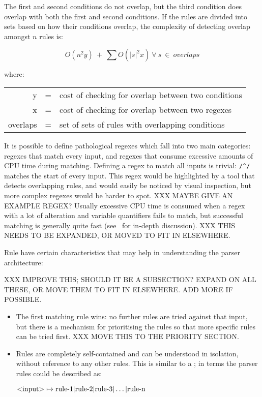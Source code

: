 \noindent{}The first and second conditions do not overlap, but the third
condition does overlap with both the first and second conditions.  If the
rules are divided into sets based on how their conditions overlap, the
complexity of detecting overlap amongst $n$ rules is:

$$O(n^{2}y)~+~\sum{O(|s|^{2}x)~\forall{}~s~\in{}~overlaps}$$

where:

\begin{tabular}[]{rcl}

            y & = & cost of checking for overlap between two conditions \\
            x & = & cost of checking for overlap between two regexes    \\
     overlaps & = & set of sets of rules with overlapping conditions    \\

\end{tabular}

It is possible to define pathological regexes which fall into two main
categories: regexes that match every input, and regexes that consume
excessive amounts of CPU time during matching.  Defining a regex to match
all inputs is trivial: \verb!/^/! matches the start of every input.  This
regex would be highlighted by a tool that detects overlapping rules, and
would easily be noticed by visual inspection, but more complex regexes
would be harder to spot.  XXX MAYBE GIVE AN EXAMPLE REGEX\@?  Usually
excessive CPU time is consumed when a regex with a lot of alteration and
variable quantifiers fails to match, but successful matching is generally
quite fast (see~\cite{mastering-regular-expressions} for in-depth
discussion).  XXX THIS NEEDS TO BE EXPANDED, OR MOVED TO FIT IN
ELSEWHERE\@.

Rule have certain characteristics that may help in understanding the
parser architecture:

XXX IMPROVE THIS\@; SHOULD IT BE A SUBSECTION\@?  EXPAND ON ALL THESE, OR
MOVE THEM TO FIT IN ELSEWHERE\@.  ADD MORE IF POSSIBLE\@.

\begin{itemize}

    \item The first matching rule wins: no further rules are tried against
        that input, but there is a mechanism for prioritising the rules so
        that more specific rules can be tried first.  XXX MOVE THIS TO THE
        PRIORITY SECTION\@.

    \item Rules are completely self-contained and can be understood in
        isolation, without reference to any other rules.  This is similar
        to a ; in  terms the parser rules could
        be described as:

        $\text{\textless{}input\textgreater{}} \mapsto \text{rule-1} |
        \text{rule-2} | \text{rule-3} | \dots | \text{rule-n}$

\end{itemize}

